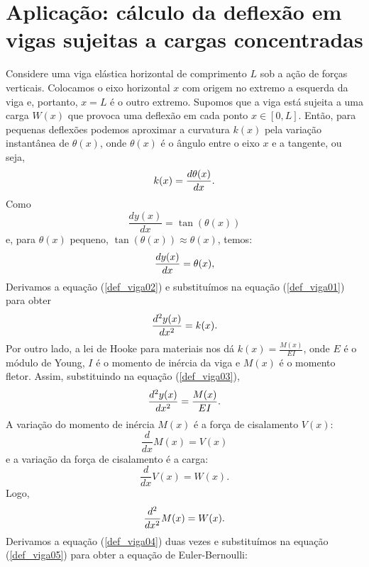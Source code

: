 \section{Aplicação: cálculo da deflexão em vigas sujeitas a cargas concentradas}
Considere uma viga elástica horizontal de comprimento $L$ sob a ação de forças verticais. Colocamos o eixo horizontal $x$ com origem no extremo a esquerda da viga e, portanto, $x=L$ é o outro extremo. Supomos que a viga está sujeita a uma carga $W(x)$ que provoca uma deflexão em cada ponto $x\in[0,L]$. Então, para pequenas deflexões podemos aproximar a curvatura $k(x)$ pela variação instantânea de $\theta(x)$, onde $\theta(x)$ é o ângulo entre o eixo $x$ e a tangente, ou seja, 
\begin{equation}{\label{def_viga01}}
k(x)=\frac{d\theta(x)}{dx}.
\end{equation}
Como
\begin{equation}
\frac{dy(x)}{dx}=\tan(\theta(x))
\end{equation}
e, para $\theta(x)$ pequeno, $\tan(\theta(x))\approx \theta(x)$, temos:
\begin{equation}{\label{def_viga02}}
\frac{dy(x)}{dx}=\theta(x),
\end{equation}
Derivamos a equação (\ref{def_viga02}) e substituímos na equação (\ref{def_viga01}) para obter
\begin{equation}{\label{def_viga03}}
\frac{d^2y(x)}{dx^2}=k(x).
\end{equation}
Por outro lado, a lei de Hooke para materiais nos dá $k(x)=\frac{M(x)}{EI}$, onde $E$ é o módulo de Young, $I$ é o momento de inércia da viga e $M(x)$ é o momento fletor. Assim, substituindo na equação (\ref{def_viga03}),
\begin{equation}{\label{def_viga04}}
\frac{d^2y(x)}{dx^2}=\frac{M(x)}{EI}.
\end{equation}
A variação do momento de inércia $M(x)$ é a força de cisalamento $V(x)$:
\begin{equation}
\frac{d}{dx}M(x)=V(x)
\end{equation}
e a variação da força de cisalamento é a carga:
\begin{equation}
\frac{d}{dx}V(x)=W(x).
\end{equation}
Logo,
\begin{equation}{\label{def_viga05}}
\frac{d^2}{dx^2}M(x)=W(x).
\end{equation}
Derivamos a equação (\ref{def_viga04}) duas vezes e substituímos na equação (\ref{def_viga05}) para obter a equação de Euler-Bernoulli:
